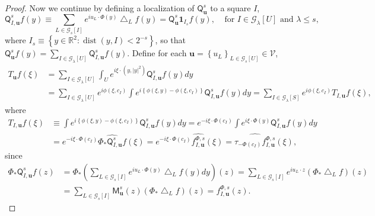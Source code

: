 \documentclass{amsart}%
\theoremstyle{plain}
\numberwithin{equation}{section}
\begin{document}
\begin{proof}
Now we continue by defining a localization of $\mathsf{Q}_{\mathbf{u}}^{s}$ to
a square $I$,
\[
\mathsf{Q}_{I,\mathbf{u}}^{s}f\left(  y\right)  \equiv\sum_{L\in
\mathcal{G}_{s}\left[  I\right]  }e^{iu_{L}\cdot\Phi\left(  y\right)
}\bigtriangleup_{L}f\left(  y\right)  =\mathsf{Q}_{\mathbf{u}}^{s}%
\mathbf{1}_{I_{s}}f\left(  y\right)  ,\ \ \ \ \ \text{for }I\in\mathcal{G}%
_{\lambda}\left[  U\right]  \text{ and }\lambda\leq s,
\]
where $I_{s}\equiv\left\{  y\in\mathbb{R}^{2}:\operatorname*{dist}\left(
y,I\right)  <2^{-s}\right\}  $, so that $\mathsf{Q}_{\mathbf{u}}^{s}f\left(
y\right)  =\sum_{I\in\mathcal{G}_{\lambda}\left[  U\right]  }\mathsf{Q}%
_{I,\mathbf{u}}^{s}f\left(  y\right)  $. Define for each $\mathbf{u}=\left\{
u_{L}\right\}  _{L\in\mathcal{G}_{s}\left[  U\right]  }\in\mathcal{V}$,%
\begin{align*}
T_{\mathbf{u}}f\left(  \xi\right)   &  =\sum_{I\in\mathcal{G}_{\lambda}\left[
U\right]  }\int_{U}e^{i\xi\cdot\left(  y,\left\vert y\right\vert ^{2}\right)
}\mathsf{Q}_{I,\mathbf{u}}^{s}f\left(  y\right)  dy\\
&  =\sum_{I\in\mathcal{G}_{\lambda}\left[  U\right]  }e^{i\phi\left(
\xi,c_{I}\right)  }\int e^{i\left\{  \phi\left(  \xi,y\right)  -\phi\left(
\xi,c_{I}\right)  \right\}  }\mathsf{Q}_{I,\mathbf{u}}^{s}f\left(  y\right)
dy=\sum_{I\in\mathcal{G}_{\lambda}\left[  S\right]  }e^{i\phi\left(  \xi
,c_{I}\right)  }T_{I,\mathbf{u}}f\left(  \xi\right)  ,
\end{align*}
where%
\begin{align*}
T_{I,\mathbf{u}}f\left(  \xi\right)   &  \equiv\int e^{i\left\{  \phi\left(
\xi,y\right)  -\phi\left(  \xi,c_{I}\right)  \right\}  }\mathsf{Q}%
_{I,\mathbf{u}}^{s}f\left(  y\right)  dy=e^{-i\xi\cdot\Phi\left(
c_{I}\right)  }\int e^{i\xi\cdot\Phi\left(  y\right)  }\mathsf{Q}%
_{I,\mathbf{u}}^{s}f\left(  y\right)  dy\\
&  =e^{-i\xi\cdot\Phi\left(  c_{I}\right)  }\widehat{\Phi_{\ast}%
\mathsf{Q}_{I,\mathbf{u}}^{s}f}\left(  \xi\right)  =e^{-i\xi\cdot\Phi\left(
c_{I}\right)  }\widehat{f_{I,\mathbf{u}}^{\Phi,s}}\left(  \xi\right)
=\widehat{\tau_{-\Phi\left(  c_{I}\right)  }f_{I,\mathbf{u}}^{\Phi,s}}\left(
\xi\right)  ,
\end{align*}
since%
\begin{align*}
\Phi_{\ast}\mathsf{Q}_{I,\mathbf{u}}^{s}f\left(  z\right)   &  =\Phi_{\ast
}\left(  \sum_{L\in\mathcal{G}_{s}\left[  I\right]  }e^{iu_{L}\cdot\Phi\left(
y\right)  }\bigtriangleup_{L}f\left(  y\right)  dy\right)  \left(  z\right)
=\sum_{L\in\mathcal{G}_{s}\left[  I\right]  }e^{iu_{L}\cdot z}\left(
\Phi_{\ast}\bigtriangleup_{L}f\right)  \left(  z\right) \\
&  =\sum_{L\in\mathcal{G}_{s}\left[  I\right]  }\mathsf{M}_{\mathbf{u}}%
^{s}\left(  z\right)  \left(  \Phi_{\ast}\bigtriangleup_{L}f\right)  \left(
z\right)  =f_{I,\mathbf{u}}^{\Phi,s}\left(  z\right)  .
\end{align*}



\end{proof}
\end{document}
